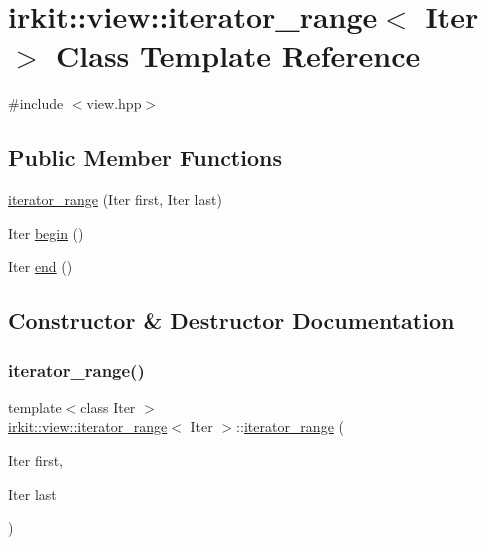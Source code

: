 \hypertarget{classirkit_1_1view_1_1iterator__range}{}\section{irkit\+:\+:view\+:\+:iterator\+\_\+range$<$ Iter $>$ Class Template Reference}
\label{classirkit_1_1view_1_1iterator__range}


{\ttfamily \#include $<$view.\+hpp$>$}

\subsection*{Public Member Functions}
\begin{DoxyCompactItemize}
\item 
\hyperlink{classirkit_1_1view_1_1iterator__range_a471414436e90dfed5608b05d83a3497c}{iterator\+\_\+range} (Iter first, Iter last)
\item 
Iter \hyperlink{classirkit_1_1view_1_1iterator__range_a510f0a679cad2562b8537fafef71cf5e}{begin} ()
\item 
Iter \hyperlink{classirkit_1_1view_1_1iterator__range_ae3f8255c281477d615a56b81c736cdae}{end} ()
\end{DoxyCompactItemize}


\subsection{Constructor \& Destructor Documentation}
\mbox{\label{classirkit_1_1view_1_1iterator__range_a471414436e90dfed5608b05d83a3497c}} 
\subsubsection{\texorpdfstring{iterator\+\_\+range()}{iterator\_range()}}
{\footnotesize\ttfamily template$<$class Iter $>$ \\
\hyperlink{classirkit_1_1view_1_1iterator__range}{irkit\+::view\+::iterator\+\_\+range}$<$ Iter $>$\+::\hyperlink{classirkit_1_1view_1_1iterator__range}{iterator\+\_\+range} (\begin{DoxyParamCaption}\item[{Iter}]{first,  }\item[{Iter}]{last }\end{DoxyParamCaption})\hspace{0.3cm}{\ttfamily [inline]}}



